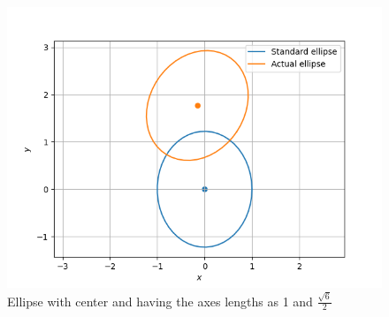 \begin{figure}[!ht]
\centering
\includegraphics[width=\columnwidth]{./solutions/41/ex/Assignment7.png}

\caption{Ellipse with center  and having the axes lengths as 1 and $\frac{\sqrt{6}}{2}$}
\label{eq:solutions/41/ex/Fig:Circle}
\end{figure}

